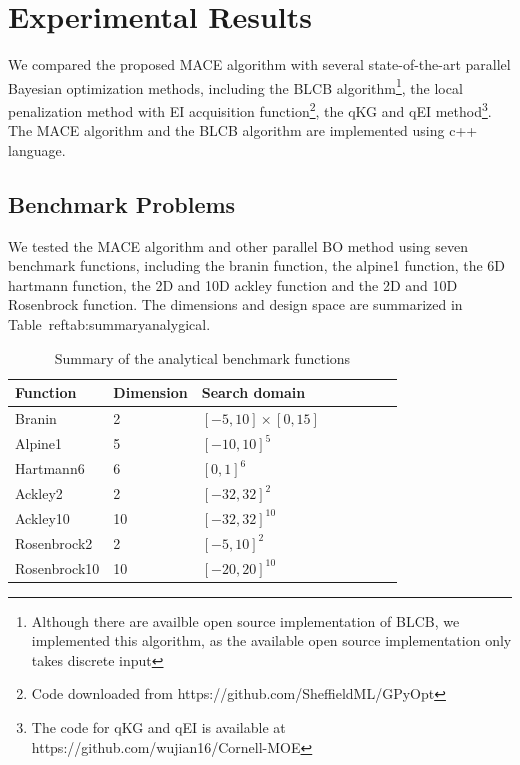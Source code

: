 \section{Experimental Results}


We compared the proposed MACE algorithm with several state-of-the-art parallel Bayesian optimization methods, including the BLCB algorithm\footnote{Although there are availble open source implementation of BLCB, we implemented this algorithm, as the available open source implementation only takes discrete input}, the local penalization method with EI acquisition function\footnote{Code downloaded from https://github.com/SheffieldML/GPyOpt}, the qKG and qEI method\footnote{The code for qKG and qEI is available at https://github.com/wujian16/Cornell-MOE}. The MACE algorithm and the BLCB algorithm are implemented using c++ language. 

\subsection{Benchmark Problems}

We tested the MACE algorithm and other parallel BO method using seven benchmark
functions, including the branin function, the alpine1 function, the 6D hartmann
function, the 2D and 10D ackley function and the 2D and 10D Rosenbrock
function. The dimensions and design space are summarized in
Table~ref{tab:summaryanalygical}.

\begin{table}[htbp]
    \centering
    \caption{Summary of the analytical benchmark functions}
    \label{tab:summaryanalygical}
    \begin{tabular}{llllllll}
        \toprule
        Function            & Dimension        & Search domain    \\ \midrule
         Branin             & 2                & $[-5,  10]\times[0, 15]$ \\
         Alpine1            & 5                & $[-10, 10]^5$           \\
         Hartmann6          & 6                & $[0,   1]^6$              \\
         Ackley2            & 2                & $[-32, 32]^2$           \\
         Ackley10           & 10               & $[-32, 32]^{10}$          \\
         Rosenbrock2        & 2                & $[-5,  10]^2$            \\
         Rosenbrock10       & 10               & $[-20, 20]^{10}$          \\
        \bottomrule
    \end{tabular}
\end{table}

